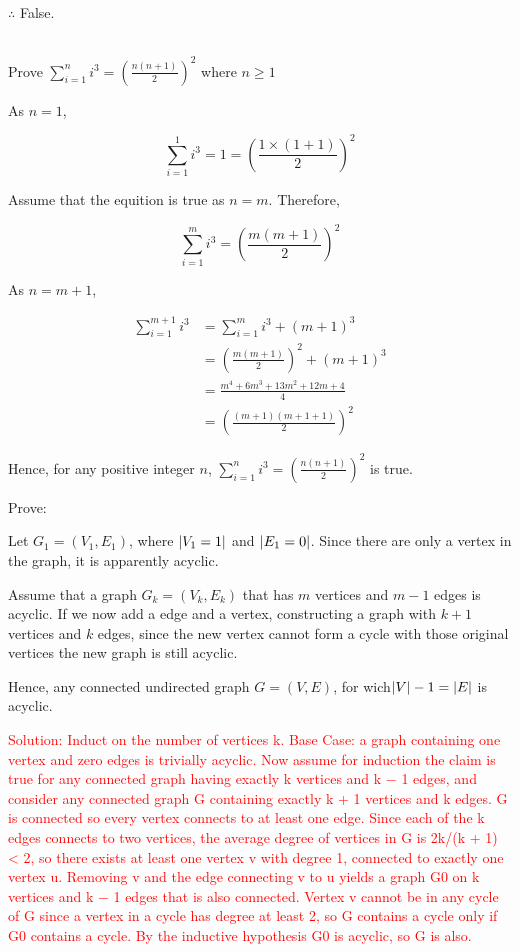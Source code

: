 \documentclass[12pt,twoside]{article}
\begin{document}
\begin{problems}
\begin{problemparts}
$\therefore$ False.
\end{problemparts}

\newpage
\problem  %

\\


Prove $\sum_{i=1}^{n} i^3 = (\frac{n (n+1)}{2})^2$ where $n \geqslant 1$

As $n=1$,

$$\sum_{i=1}^{1} i^3 = 1 = \left(\frac{1 \times (1+1)}{2}\right)^2$$

Assume that the equition is true as $n=m$. Therefore,

$$\sum_{i=1}^{m} i^3 = \left(\frac{m (m+1)}{2}\right)^2$$

As $n=m+1$, 

$$
\begin {aligned}
    \sum_{i=1}^{m+1} i^3
    &= \sum_{i=1}^{m} i^3 + {(m+1)}^3\\
    &= \left(\frac{m (m+1)}{2}\right)^2+{(m+1)}^3\\
    &= \frac{m^4+6m^3+13m^2+12m+4}{4}\\
    &= \left(\frac{(m+1)(m+1+1)}{2}\right)^2
\end {aligned}
$$

Hence, for any positive integer $n$, 
$\sum_{i=1}^{n} i^3 = {\left(\frac{n (n+1)}{2}\right)}^2$ is true.

\newpage
\problem  %

Prove:

Let $G_1=(V_1,E_1)$, where $\left| V_1=1\right|$ and $\left| E_1=0\right|$.
Since there are only a vertex in the graph, it is apparently acyclic.

Assume that a graph $G_k=(V_k,E_k)$ that has $m$ vertices and $m-1$ edges is acyclic. 
If we now add a edge and a vertex, constructing a graph with $k+1$ vertices and $k$ edges, 
since the new vertex cannot form a cycle with those original vertices 
the new graph is still acyclic.

Hence, any connected undirected graph $G=(V,E)$, for wich$\left| V\right|-1=\left| E\right|$ is acyclic.



\textcolor{red}{
 Solution: 
 Induct on the number of vertices k. Base Case:
 a graph containing one vertex and zero edges is trivially acyclic. 
 Now assume for induction the claim is true 
 for any connected graph having exactly k vertices and k − 1 edges,
 and consider any connected graph G containing exactly k + 1 vertices and k edges. G is connected 
 so every vertex connects to at least one edge. 
 Since each of the k edges connects to two vertices, the average degree of vertices in G is 2k/(k + 1) < 2, 
 so there exists at least one vertex v with degree 1, connected to exactly one vertex u. 
 Removing v and the edge connecting v to u yields a graph G0 on k vertices and k − 1 edges that is also connected. 
 Vertex v cannot be in any cycle of G since a vertex in a cycle has degree at least 2, 
 so G contains a cycle only if G0 contains a cycle. 
 By the inductive hypothesis G0 is acyclic, so G is also.
}




\end{problems}
\end{document}

